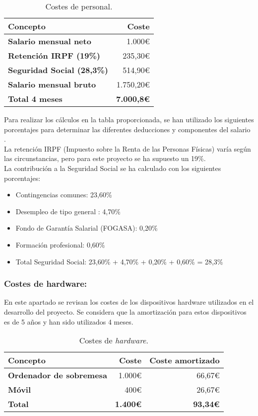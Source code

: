 \begin{table}[h!]
    \centering
    \begin{tabular}{>{\bfseries}l r}
        \toprule
        \textbf{Concepto} & \textbf{Coste} \\
        \midrule
        Salario mensual neto & 1.000€ \\
        Retención IRPF (19\%) & 235,30€ \\
        Seguridad Social (28,3\%) & 514,90€ \\
        Salario mensual bruto & 1.750,20€ \\
        \midrule
        \textbf{Total 4 meses} & \textbf{7.000,8€} \\
        \bottomrule
    \end{tabular}
    \caption{Costes de personal.}
    \label{tabla:costes}
\end{table}
Para realizar los cálculos en la tabla proporcionada, se han utilizado los siguientes porcentajes para determinar las diferentes deducciones y componentes del salario \cite{SS:latex}. \\
La retención IRPF (Impuesto sobre la Renta de las Personas Físicas) varía según las circunstancias, pero para este proyecto se ha supuesto un 19\%. \\
La contribución a la Seguridad Social se ha calculado con los siguientes porcentajes: 
\begin{itemize}
    \item Contingencias comunes: 23,60\%
    \item Desempleo de tipo general : 4,70\%
    \item Fondo de Garantía Salarial (FOGASA): 0,20\%
    \item Formación profesional: 0,60\%
    \item Total Seguridad Social: 23,60\% + 4,70\% + 0,20\% + 0,60\% = 28,3\%
\end{itemize}

\subsubsection{Costes de hardware:}
En este apartado se revisan los costes de los dispositivos hardware utilizados en el desarrollo del proyecto. Se considera que la amortización para estos dispositivos es de 5 años y han sido utilizados 4 meses.
\begin{table}[h!]
    \centering
    \begin{tabular}{>{\bfseries}l r r}
        \toprule
        \textbf{Concepto} & \textbf{Coste} & \textbf{Coste amortizado} \\
        \midrule
        Ordenador de sobremesa & 1.000€ & 66,67€ \\
        Móvil & 400€ & 26,67€ \\
        \midrule
        \textbf{Total} & \textbf{1.400€} & \textbf{93,34€} \\
        \bottomrule
    \end{tabular}
    \caption{Costes de \textit{hardware}.}
    \label{tabla:costes_hardware}
\end{table}
